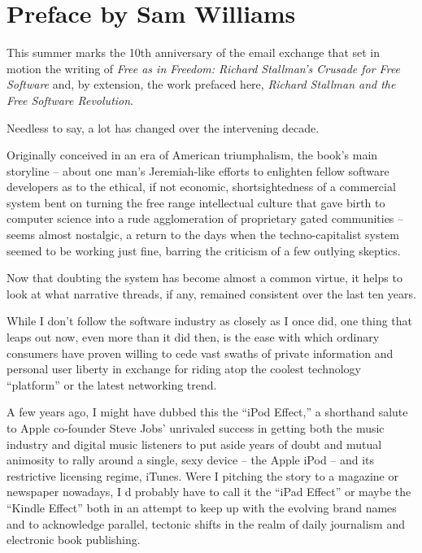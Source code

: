 

\chapter{Preface by Sam Williams}

This summer marks the 10th anniversary of the email exchange that set
in motion the writing of \textit{Free as in Freedom: Richard
  Stallman's Crusade for Free Software} and, by extension, the work
prefaced here, \textit{Richard Stallman and the Free Software
  Revolution}.

Needless to say, a lot has changed over the intervening decade.

Originally conceived in an era of American triumphalism, the book's
main storyline -- about one man's Jeremiah-like efforts to enlighten
fellow software developers as to the ethical, if not economic,
shortsightedness of a commercial system bent on turning the free range
intellectual culture that gave birth to computer science into a rude
agglomeration of proprietary gated communities -- seems almost
nostalgic, a return to the days when the techno-capitalist system
seemed to be working just fine, barring the criticism of a few
outlying skeptics.

Now that doubting the system has become almost a common virtue, it  
helps to look at what narrative threads, if any, remained consistent  
over the last ten years.

While I don't follow the software industry as closely as I once did,  
one thing that leaps out now, even more than it did then, is the ease  
with which ordinary consumers have proven willing to cede vast swaths  
of private information and personal user liberty in exchange for  
riding atop the coolest technology ``platform'' or the latest networking  
trend.

A few years ago, I might have dubbed this the ``iPod Effect,'' a
shorthand salute to Apple co-founder Steve Jobs' unrivaled success in
getting both the music industry and digital music listeners to put
aside years of doubt and mutual animosity to rally around a single,
sexy device -- the Apple iPod -- and its restrictive licensing regime,
iTunes. Were I pitching the story to a magazine or newspaper nowadays,
I d probably have to call it the ``iPad Effect'' or maybe the ``Kindle
Effect'' both in an attempt to keep up with the evolving brand names
and to acknowledge parallel, tectonic shifts in the realm of daily
journalism and electronic book publishing.

